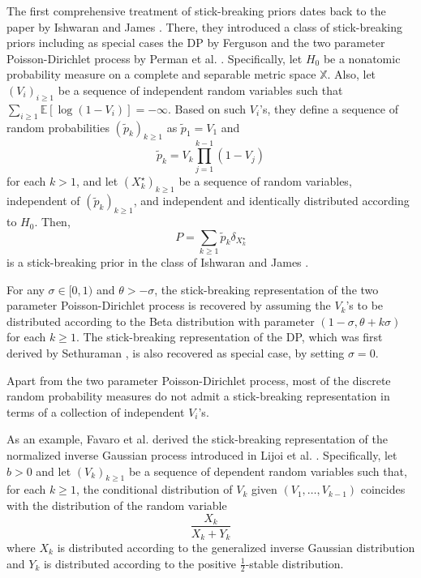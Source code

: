 The first comprehensive treatment of stick-breaking priors dates back to the paper by Ishwaran and James \cite{Ishwaran:2001dw}. There, they introduced a class of stick-breaking priors including as special cases the \acrlong{DP} by Ferguson \cite{ferguson73} and the two parameter Poisson-Dirichlet process by Perman et al. \cite{Perman:1992ke}. Specifically, let $H_0$ be a nonatomic probability measure on a complete and separable metric space $\mathbb{X}$.
Also, let $(V_i)_{i \ge 1}$ be a sequence of independent random variables such that $\sum_{i \ge 1}{\mathbb{E}[\log(1 - V_i)]} = - \infty$.
Based on such $V_i$'s, they define a sequence of random probabilities $(\tilde{p}_k)_{k \ge 1}$ as $\tilde{p}_1 = V_1$ and
\begin{equation} \label{eq:Stick_breaking}
\tilde{p}_k = V_k \prod_{j=1}^{k-1}{(1-V_j)} 
\end{equation}
for each $k > 1$, and let $(X^\star_k)_{k \ge 1}$ be a sequence of random variables, independent
of $(\tilde{p}_k)_{k \ge 1}$, and independent and identically distributed according to $H_0$. Then,
$$ P = \sum_{k \ge 1}{\tilde{p}_k \delta_{X_k^\star}} $$
is a stick-breaking prior in the class of Ishwaran and James \cite{Ishwaran:2001dw}.

For any $\sigma \in [0,1)$ and $\theta > -\sigma$, the stick-breaking representation of the two parameter Poisson-Dirichlet process is recovered by assuming the $V_k$'s to be distributed according to the Beta distribution with parameter $(1 - \sigma, \theta + k\sigma)$ for each $k \ge 1$.
The stick-breaking representation of the \gls{DP}, which was first derived by Sethuraman \cite{sethuraman94}, is also recovered as special case, by setting $\sigma = 0$.

Apart from the two parameter Poisson-Dirichlet process, most of the discrete random probability measures do not admit a stick-breaking representation in terms of a collection of independent $V_i$'s.%

As an example, Favaro et al. \cite{Favaro:2012ht} derived the stick-breaking representation of the normalized inverse Gaussian process introduced in Lijoi et al. \cite{Lijoi:2005ku}. Specifically, let $b > 0$ and let $(V_k)_{k \ge 1}$ be a sequence of dependent random variables such that, for each $k \ge 1$, the conditional distribution of $V_k$ given $(V_1,\dots,V_{k-1})$ coincides with the distribution of the random variable
\begin{equation} \label{eq:IGP}
\frac{X_k}{X_k + Y_k}
\end{equation}
where $X_k$ is distributed according to the generalized inverse Gaussian distribution and $Y_k$ is distributed according to the positive $\frac{1}{2}$-stable distribution.


